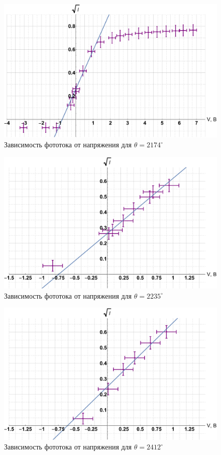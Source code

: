 \documentclass[12pt]{kiarticle} %
\begin{document}
\begin{figure}[h!]
	\includegraphics[scale=0.5]{Ibig.pdf}
	\caption{Зависимость фототока от напряжения для $ \theta = 2174^\circ $}
	\label{graf_Ibig}
\end{figure} 

\begin{figure}[h!]
	\includegraphics[scale=0.5]{2235.pdf}
	\caption{Зависимость фототока от напряжения для $ \theta = 2235^\circ $}
	\label{graf 2235}
\end{figure} 

\begin{figure}[h!]
	\includegraphics[scale=0.5]{2412.pdf}
	\caption{Зависимость фототока от напряжения для $ \theta = 2412^\circ $}
	\label{graf 2412}
\end{figure} 
\end{document}
